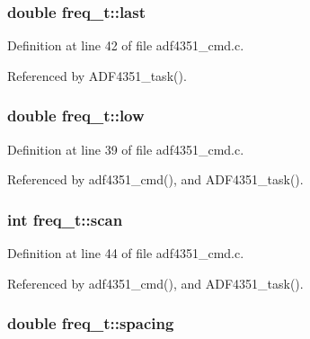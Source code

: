 \subsubsection[{\texorpdfstring{last}{last}}]{\setlength{\rightskip}{0pt plus 5cm}double freq\+\_\+t\+::last}\hypertarget{structfreq__t_ac2ff1273277e2381f7e7ab4045d01e24}{}\label{structfreq__t_ac2ff1273277e2381f7e7ab4045d01e24}


Definition at line 42 of file adf4351\+\_\+cmd.\+c.



Referenced by A\+D\+F4351\+\_\+task().

\subsubsection[{\texorpdfstring{low}{low}}]{\setlength{\rightskip}{0pt plus 5cm}double freq\+\_\+t\+::low}\hypertarget{structfreq__t_a05c64bd7de3b2d127f9c5b1850507220}{}\label{structfreq__t_a05c64bd7de3b2d127f9c5b1850507220}


Definition at line 39 of file adf4351\+\_\+cmd.\+c.



Referenced by adf4351\+\_\+cmd(), and A\+D\+F4351\+\_\+task().

\subsubsection[{\texorpdfstring{scan}{scan}}]{\setlength{\rightskip}{0pt plus 5cm}int freq\+\_\+t\+::scan}\hypertarget{structfreq__t_a7ed144285727b1a56762fb1299e44bf6}{}\label{structfreq__t_a7ed144285727b1a56762fb1299e44bf6}


Definition at line 44 of file adf4351\+\_\+cmd.\+c.



Referenced by adf4351\+\_\+cmd(), and A\+D\+F4351\+\_\+task().

\subsubsection[{\texorpdfstring{spacing}{spacing}}]{\setlength{\rightskip}{0pt plus 5cm}double freq\+\_\+t\+::spacing}\hypertarget{structfreq__t_a529edbab4fea39cfe32405d5f8c07ab4}{}\label{structfreq__t_a529edbab4fea39cfe32405d5f8c07ab4}


